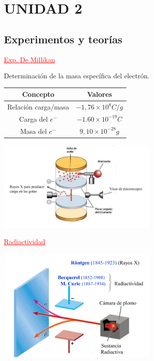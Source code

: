 \saltoPag%
\section{UNIDAD 2}
    \subsection{Experimentos y teorías}
        \begin{center} \textcolor{red}{\underline{Exp. De Millikan}} \end{center}
        \indent Determinación de la masa específica del electrón.
        \begin{center} 
            \begin{tabular}{|| c | c ||}
                \hline
                \textbf{Concepto}    &   \textbf{Valores}     \\
                \hline
                \hline
                Relación carga/masa  &   $-1,76 \times 10^8 C/g$ \\
                \hline
                Carga del $e^-$      &  $-1.60 \times 10^{-19} C$ \\
                \hline
                Masa del $e^-$       &  $9,10 \times 10^{-28} g$ \\
                \hline
            \end{tabular}
        \end{center}

        \begin{center} \includegraphics[width=8cm]{./imagenes/experienciaMIllikan.png} \end{center}

        \begin{center} \textcolor{red}{\underline{Radiactividad}} \end{center}
            \begin{center} \includegraphics[width=8cm]{./imagenes/radiactividadExperimento.png} \end{center}

